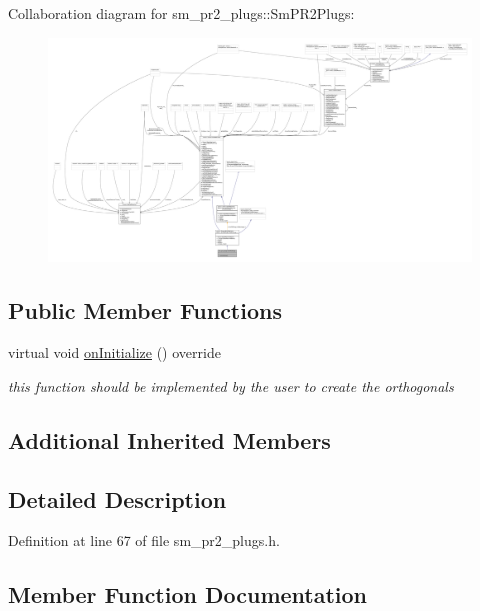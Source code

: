 Collaboration diagram for sm\+\_\+pr2\+\_\+plugs\+:\+:Sm\+P\+R2\+Plugs\+:
\nopagebreak
\begin{figure}[H]
\begin{center}
\leavevmode
\includegraphics[width=350pt]{structsm__pr2__plugs_1_1SmPR2Plugs__coll__graph}
\end{center}
\end{figure}
\subsection*{Public Member Functions}
\begin{DoxyCompactItemize}
\item 
virtual void \hyperlink{structsm__pr2__plugs_1_1SmPR2Plugs_acfafd0eeb3863f00a79704f656d4f4c6}{on\+Initialize} () override
\begin{DoxyCompactList}\small\item\em this function should be implemented by the user to create the orthogonals \end{DoxyCompactList}\end{DoxyCompactItemize}
\subsection*{Additional Inherited Members}


\subsection{Detailed Description}


Definition at line 67 of file sm\+\_\+pr2\+\_\+plugs.\+h.



\subsection{Member Function Documentation}
\mbox{\label{structsm__pr2__plugs_1_1SmPR2Plugs_acfafd0eeb3863f00a79704f656d4f4c6}} 
